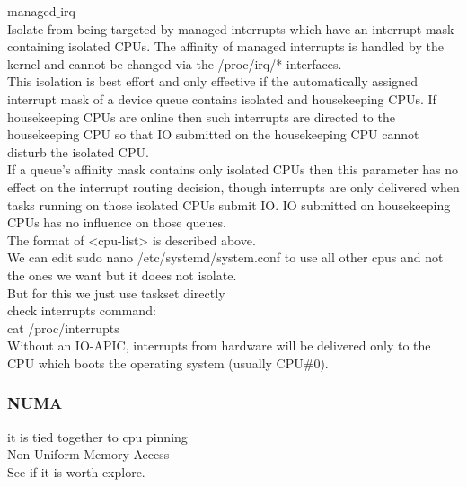 \documentclass[11pt, a4paper, oneside]{article}
\theoremstyle{definition}
\begin{document}
                        managed$\_$irq\\

                          Isolate from being targeted by managed interrupts
                          which have an interrupt mask containing isolated
                          CPUs. The affinity of managed interrupts is
                          handled by the kernel and cannot be changed via
                          the /proc/irq/* interfaces.\\

                          This isolation is best effort and only effective
                          if the automatically assigned interrupt mask of a
                          device queue contains isolated and housekeeping
                          CPUs. If housekeeping CPUs are online then such
                          interrupts are directed to the housekeeping CPU
                          so that IO submitted on the housekeeping CPU
                          cannot disturb the isolated CPU.\\

                          If a queue's affinity mask contains only isolated
                          CPUs then this parameter has no effect on the
                          interrupt routing decision, though interrupts are
                          only delivered when tasks running on those
                          isolated CPUs submit IO. IO submitted on
                          housekeeping CPUs has no influence on those
                          queues.\\

                        The format of <cpu-list> is described above.\\


We can edit sudo nano /etc/systemd/system.conf to use all other cpus and not the ones we want
but it doees not isolate.\\
But for this we just use taskset directly\\

check interrupts command:\\
cat /proc/interrupts \\
Without an IO-APIC, interrupts from hardware will be delivered only to the CPU which boots the operating system (usually CPU$\#$0).\\
\subsubsection{NUMA}
it is tied together to cpu pinning\\
Non Uniform Memory Access\\
See if it is worth explore.\\
\end{document}
